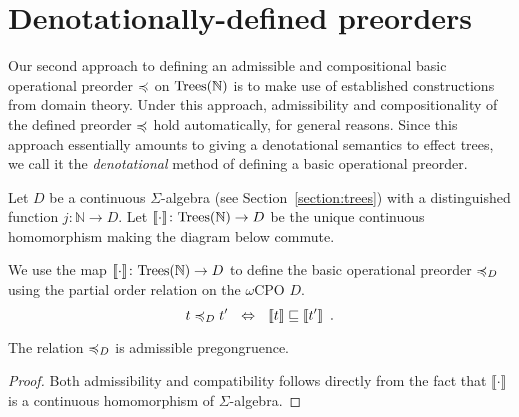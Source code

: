 \section{Denotationally-defined preorders}

Our second approach to defining an admissible and compositional basic operational
preorder $\preccurlyeq$ on $\textnormal{Trees}(\mathbb{N})$ is to make use of established constructions from domain theory.
Under this approach, admissibility and compositionality of the defined preorder $\preccurlyeq$ hold automatically,
for general reasons. Since this approach essentially amounts to giving a denotational semantics to effect trees, we call it the 
\emph{denotational} method of defining a basic operational preorder.

Let $D$ be a continuous $\Sigma$-algebra (see Section~\ref{section:trees}) with a distinguished function 
$j\colon \mathbb{N} \to D$. Let   $\llbracket \cdot \rrbracket \colon \textnormal{Trees}(\mathbb{N}) \to D$ be the unique continuous homomorphism
making the diagram below commute.
   \begin{center}
    \end{center}
\noindent
We use the map $\llbracket \cdot \rrbracket \colon \textnormal{Trees}(\mathbb{N}) \to D$ to define 
the basic operational preorder $\preccurlyeq_D$ using the partial order relation on the $\omega$CPO $D$.
\[
t \preccurlyeq_D t' ~~ \Leftrightarrow ~~ \llbracket t \rrbracket \sqsubseteq \llbracket t'  \rrbracket \enspace .
\]
\begin{proposition}
The relation $\preccurlyeq_D$ is admissible pregongruence.
\end{proposition}

\begin{proof}
    Both admissibility and compatibility follows directly from the 
    fact that $\llbracket \cdot \rrbracket$ is a continuous 
    homomorphism of $\Sigma$-algebra.
\end{proof}


